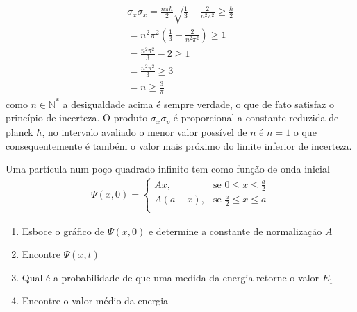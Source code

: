 \begin{prob}
\begin{sol}
\begin{align}
			\begin{split}
				\sigma_{x} \sigma_{x} = \frac{n \pi \hbar}{2}\sqrt{\frac{1}{3}-\frac{2}{n^{2} \pi^{2}}}\geq \frac{\hbar}{2}\\
				=n^{2} \pi^{2}\left(\frac{1}{3}-\frac{2}{n^{2} \pi^{2}}\right)\geq 1\\
				=\frac{n^{2} \pi^{2}}{3}-2\geq 1\\
				=\frac{n^{2} \pi^{2}}{3}\geq 3\\
				=n\geq \frac{3}{\pi}
			\end{split}
		\end{align}
		como $n\in\mathbb{N^{*}}$ a desigualdade acima é sempre verdade, o que de fato satisfaz o princípio de incerteza. O produto $\sigma_{x} \sigma_{p}$ é proporcional a constante reduzida de planck $\hbar$, no intervalo avaliado o menor valor possível de $n$ é $n=1$ o que consequentemente é também o valor mais próximo do limite inferior de incerteza.


	\end{sol}
\end{prob}
\begin{prob}
	Uma partícula num poço quadrado infinito tem como função de onda inicial
	\begin{eqnarray*}
		\Psi(x,0)=
		\begin{cases}
			Ax, &\text{se $0\leq x \leq \frac{a}{2}$}\\
			A \left(a-x\right), &\text{se $\frac{a}{2}\leq x\leq a$}\\
		\end{cases}
	\end{eqnarray*}
	\begin{enumerate}[label=\alph *)]
		\item Esboce o gráfico de $\Psi(x,0)$ e determine a constante de normalização $A$
		\item Encontre $\Psi(x,t)$
		\item Qual é a probabilidade de que uma medida da energia retorne o valor $E_{1}$
		\item Encontre o valor médio da energia
	\end{enumerate}
	\begin{sol}

	\end{sol}
\end{prob}
